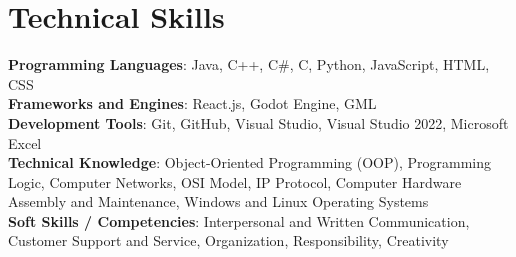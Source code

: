 \documentclass[a4paper,11pt]{article}
\begin{document}
\section{\textbf{Technical Skills}}
\begin{itemize}[leftmargin=0.05in, label={}]
    \small{\item{
     \textbf{Programming Languages}{: Java, C++, C\#, C, Python, JavaScript, HTML, CSS} \\ [1.5pt]
     \textbf{Frameworks and Engines}{: React.js, Godot Engine, GML} \\ [1.5pt]
     \textbf{Development Tools}{: Git, GitHub, Visual Studio, Visual Studio 2022, Microsoft Excel} \\ [1.5pt]
     \textbf{Technical Knowledge}{: Object-Oriented Programming (OOP), Programming Logic, Computer Networks, OSI Model, IP Protocol, Computer Hardware Assembly and Maintenance, Windows and Linux Operating Systems} \\ [1.5pt]
     \textbf{Soft Skills / Competencies}{: Interpersonal and Written Communication, Customer Support and Service, Organization, Responsibility, Creativity}
    }}
\end{itemize}
\vspace{-16pt}
\end{document}
